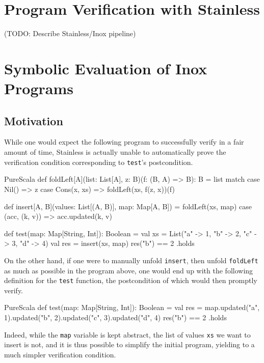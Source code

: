\documentclass[a4paper,twoside]{article}
\newcommand{\TODO}[1]{\textcolor{YellowOrange}{(TODO: #1)}} %
\newcommand{\stt}[1]{\texttt{\small{#1}}}
\begin{document}
\clearpage

\section{Program Verification with Stainless}
\label{verif}

\TODO{Describe Stainless/Inox pipeline}


\clearpage
\section{Symbolic Evaluation of Inox Programs}
\label{symbolic}

\subsection{Motivation}

While one would expect the following program to successfully verify in a fair amount of time, Stainless is actually unable to automatically prove the verification condition corresponding to \stt{test}'s postcondition.

\begin{ShortCode}{PureScala}
def foldLeft[A](list: List[A], z: B)(f: (B, A) => B): B = list match {
  case Nil() => z
  case Cons(x, xs) => foldLeft(xs, f(z, x))(f)
}

def insert[A, B](values: List[(A, B)], map: Map[A, B]) = {
  foldLeft(xs, map) {
    case (acc, (k, v)) => acc.updated(k, v)
  }
}

def test(map: Map[String, Int]): Boolean = {
  val xs = List("a" -> 1, "b" -> 2, "c" -> 3, "d" -> 4)
  val res = insert(xs, map)
  res("b") == 2
}.holds
\end{ShortCode}

On the other hand, if one were to manually unfold \stt{insert}, then unfold \stt{foldLeft} as much as possible in the program above, one would end up with the following definition for the \stt{test} function, the postcondition of which would then promptly verify.

\begin{ShortCode}{PureScala}
def test(map: Map[String, Int]): Boolean = {
  val res = map.updated("a", 1).updated("b", 2).updated("c", 3).updated("d", 4)
  res("b") == 2
}.holds
\end{ShortCode}

Indeed, while the \stt{map} variable is kept abstract, the list of values \stt{xs} we want to insert is not, and it is thus possible to simplify the initial program, yielding to a much simpler verification condition.\\
\end{document}
